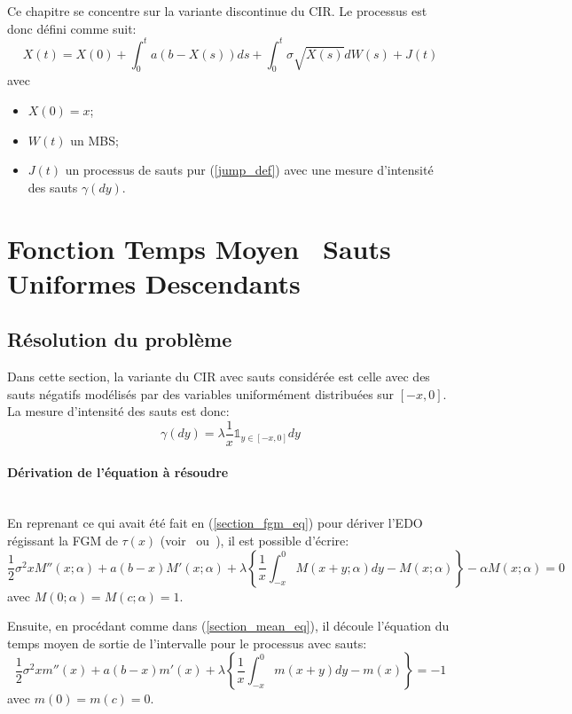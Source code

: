 \label{sec:FPT_Jump}
Ce chapitre se concentre sur la variante discontinue du \acs{CIR}. Le processus est donc défini comme suit:
\begin{equation}\label{jump_cir_sde}
    X(t)=X(0)+\int_0^t a(b-X(s))ds+\int_0^t\sigma\sqrt{X(s)}dW(s)+J(t)
\end{equation}
avec
\begin{itemize}
    \item $X(0)=x$;
    \item $W(t)$ un \acs{MBS};
    \item $J(t)$ un processus de sauts pur (\ref{jump_def}) avec une mesure d'intensité des sauts \(\gamma(dy)\).
\end{itemize}

\section{Fonction Temps Moyen \textemdash~Sauts Uniformes Descendants}\label{subsection_mean_jumps}
\subsection{Résolution du problème}
Dans cette section, la variante du \ac{CIR} avec sauts considérée est celle avec des sauts négatifs modélisés par des variables uniformément distribuées sur $[-x,0]$. La mesure d'intensité des sauts est donc:
\[
\gamma(dy)=\lambda\frac{1}{x}\mathds{1}_{y\in[-x,0]}dy
\]

\paragraph{Dérivation de l'équation à résoudre}\phantom{}\\
En reprenant ce qui avait été fait en (\ref{section_fgm_eq}) pour dériver l'\acs{EDO} régissant la \acl{FGM} de $\tau(x)$ (voir~\cite{cox2017} ou~\cite{lefebvre2007}), il est possible d'écrire:
\[
\frac{1}{2}\sigma^2 xM''(x;\alpha)+a(b-x)M'(x;\alpha)+\lambda\left\{\frac{1}{x}\int_{-x}^0M(x+y;\alpha)dy-M(x;\alpha)\right\}-\alpha M(x;\alpha)=0
\]
avec $M(0;\alpha)=M(c;\alpha)=1$.

Ensuite, en procédant comme dans (\ref{section_mean_eq}), il découle l'équation du temps moyen de sortie de l'intervalle pour le processus avec sauts:
\begin{equation}\label{mean_ide}
    \frac{1}{2}\sigma^2 xm''(x)+a(b-x)m'(x)+\lambda\left\{\frac{1}{x}\int_{-x}^0m(x+y)dy-m(x)\right\}=-1
\end{equation}
avec $m(0)=m(c)=0$.

